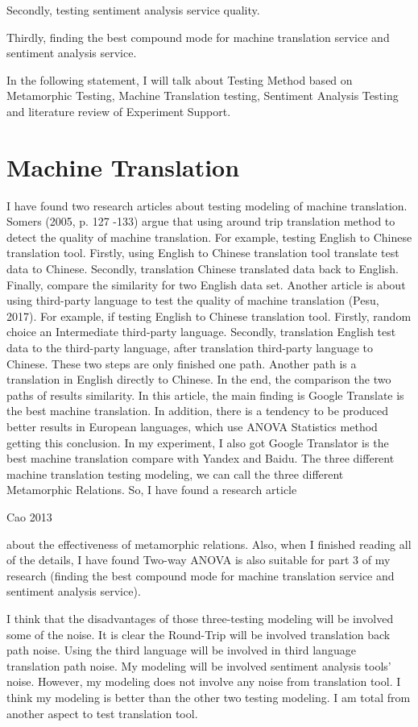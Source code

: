 \documentclass[conference]{IEEEtran}
\begin{document}
Secondly, testing sentiment analysis service quality.

Thirdly, finding the best compound mode for machine translation service and
sentiment analysis service.

In the following statement, I will talk about Testing Method based on Metamorphic Testing, Machine Translation testing, Sentiment Analysis Testing and literature review of Experiment Support.

\section{Machine Translation}
I have found two research articles about testing modeling of machine
translation.
Somers (2005, p. 127 -133) argue that using around trip translation method to
detect the quality of machine translation.
For example, testing English to Chinese translation tool.
Firstly, using English to Chinese translation tool translate test data to
Chinese.
Secondly, translation Chinese translated data back to English.
Finally, compare the similarity for two English data set. Another article is
about using third-party language to test the quality of machine translation
(Pesu, 2017). For example, if testing English to Chinese translation tool.
Firstly, random choice an Intermediate third-party language.
Secondly, translation English test data to the third-party language, after
translation third-party language to Chinese.
These two steps are only finished one path. Another path is a translation in
English directly to Chinese.
In the end, the comparison the two paths of results similarity. In this article,
the main finding is Google Translate is the best machine translation. In
addition, there is a tendency to be produced better results in European
languages, which use ANOVA Statistics method getting this conclusion.
In my experiment, I also got Google Translator is the best machine translation compare with Yandex and Baidu.
The three different machine translation testing modeling, we can call the three
different Metamorphic Relations.
So, I have found a research article

Cao 2013

about the effectiveness of metamorphic relations.
Also, when I finished reading all of the details, I have found Two-way ANOVA is
also suitable for part 3 of my research (finding the best compound mode for
machine translation service and sentiment analysis service).

I think that the disadvantages of those three-testing modeling will be involved some of the noise.
It is clear the Round-Trip will be involved translation back path noise. Using
the third language will be involved in third language translation path noise.
My modeling will be involved sentiment analysis tools’ noise. However, my
modeling does not involve any noise from translation tool. I think my modeling
is better than the other two testing modeling. I am total from another aspect
to test translation tool.
\end{document}
